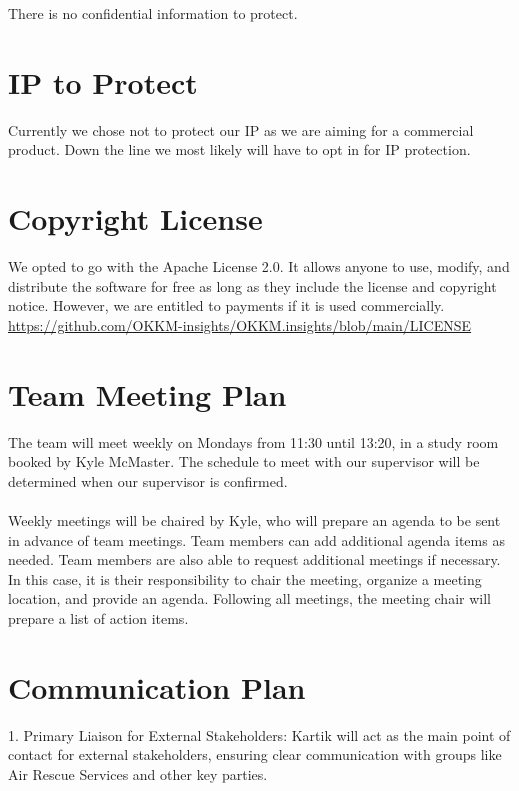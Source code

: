 \documentclass{article}
\begin{document}
There is no confidential information to protect.

\section{IP to Protect}

Currently we chose not to protect our IP as we are aiming for a commercial product. Down the line we most likely will have to opt in for IP protection.

\section{Copyright License}

We opted to go with the Apache License 2.0. It allows anyone to use, modify, and distribute the software for free as long as they include the license and copyright notice. However, we are entitled to payments if it is used commercially. \\

\url{https://github.com/OKKM-insights/OKKM.insights/blob/main/LICENSE}

\section{Team Meeting Plan}
The team will meet weekly on Mondays from 11:30 until 13:20, in a study room booked by Kyle McMaster.
The schedule to meet with our supervisor will be determined when our supervisor is confirmed.\\\\
Weekly meetings will be chaired by Kyle, who will prepare an agenda to be sent in advance of team meetings. Team members can add additional agenda items as
needed. Team members are also able to request additional meetings if necessary. In this case, it is their responsibility to chair the meeting, 
organize a meeting location, and provide an agenda. Following all meetings, the meeting chair will prepare a list of action items.


\section{Communication Plan}

1.	Primary Liaison for External Stakeholders: Kartik will act as the main point of contact for external stakeholders, ensuring clear communication with groups like Air Rescue Services and other key parties. \\
\\
\end{document}
